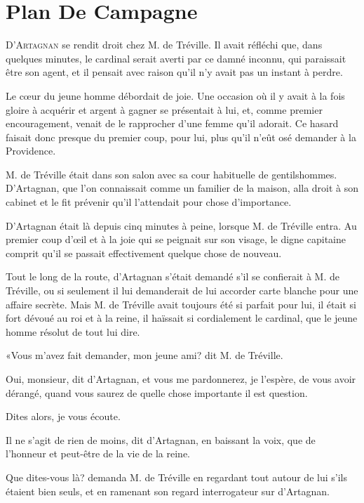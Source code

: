 
\chapter{Plan De Campagne} 
	
\lettrine{D}{'Artagnan} se rendit droit chez M. de Tréville. Il avait réfléchi que, dans quelques minutes, le cardinal serait averti par ce damné inconnu, qui paraissait être son agent, et il pensait avec raison qu'il n'y avait pas un instant à perdre. 

Le cœur du jeune homme débordait de joie. Une occasion où il y avait à la fois gloire à acquérir et argent à gagner se présentait à lui, et, comme premier encouragement, venait de le rapprocher d'une femme qu'il adorait. Ce hasard faisait donc presque du premier coup, pour lui, plus qu'il n'eût osé demander à la Providence. 

M. de Tréville était dans son salon avec sa cour habituelle de gentilshommes. D'Artagnan, que l'on connaissait comme un familier de la maison, alla droit à son cabinet et le fit prévenir qu'il l'attendait pour chose d'importance. 

D'Artagnan était là depuis cinq minutes à peine, lorsque M. de Tréville entra. Au premier coup d'œil et à la joie qui se peignait sur son visage, le digne capitaine comprit qu'il se passait effectivement quelque chose de nouveau. 

Tout le long de la route, d'Artagnan s'était demandé s'il se confierait à M. de Tréville, ou si seulement il lui demanderait de lui accorder carte blanche pour une affaire secrète. Mais M. de Tréville avait toujours été si parfait pour lui, il était si fort dévoué au roi et à la reine, il haïssait si cordialement le cardinal, que le jeune homme résolut de tout lui dire. 

«Vous m'avez fait demander, mon jeune ami? dit M. de Tréville. 

\speak  Oui, monsieur, dit d'Artagnan, et vous me pardonnerez, je l'espère, de vous avoir dérangé, quand vous saurez de quelle chose importante il est question. 

\speak  Dites alors, je vous écoute. 

\speak  Il ne s'agit de rien de moins, dit d'Artagnan, en baissant la voix, que de l'honneur et peut-être de la vie de la reine. 

\speak  Que dites-vous là? demanda M. de Tréville en regardant tout autour de lui s'ils étaient bien seuls, et en ramenant son regard interrogateur sur d'Artagnan. 

